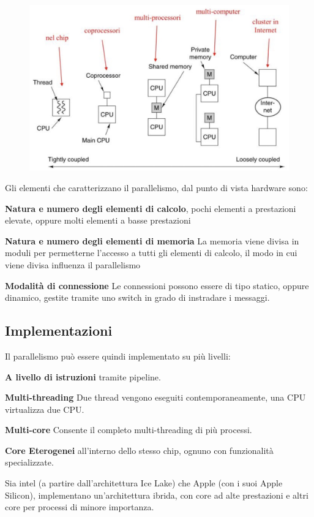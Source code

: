 \begin{figure}[H]
    \centering
    \includegraphics[width=0.45\linewidth]{assets/parallellismo.jpg}
\end{figure}

Gli elementi che caratterizzano il parallelismo, dal punto di vista hardware sono:
\begin{sitemize}
    \item \textbf{Natura e numero degli elementi di calcolo}, pochi elementi a prestazioni elevate, oppure molti elementi a basse prestazioni
    \item \textbf{Natura e numero degli elementi di memoria} La memoria viene divisa in moduli per permetterne l'accesso a tutti gli elementi di calcolo, il modo in cui viene divisa influenza il parallelismo
    \item \textbf{Modalità di connessione} Le connessioni possono essere di tipo statico, oppure dinamico, gestite tramite uno switch in grado di instradare i messaggi.
\end{sitemize}

\subsection{Implementazioni}
Il parallelismo può essere quindi implementato su più livelli:
\begin{sitemize}
    \item \textbf{A livello di istruzioni} tramite pipeline.
    \item \textbf{Multi-threading} Due thread vengono eseguiti contemporaneamente, una CPU virtualizza due CPU.
    \item \textbf{Multi-core} Consente il completo multi-threading di più processi.
    \item \textbf{Core Eterogenei} all'interno dello stesso chip, ognuno con funzionalità specializzate.
\end{sitemize}

\begin{note}
    Sia intel (a partire dall'architettura Ice Lake) che Apple (con i suoi Apple Silicon), implementano un'architettura ibrida, con core ad alte prestazioni e altri core per processi di minore importanza.
\end{note}
